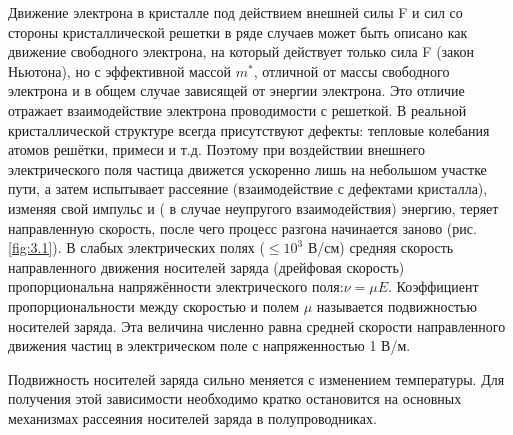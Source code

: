 Движение электрона в кристалле под действием внешней силы F и сил со стороны кристаллической решетки в ряде случаев
может быть описано как движение свободного электрона, на который действует только сила F (закон Ньютона), но с
эффективной массой $m^*$, отличной от массы свободного электрона и в общем случае зависящей от энергии электрона. Это
отличие отражает взаимодействие электрона проводимости с решеткой. 
В реальной кристаллической структуре всегда присутствуют дефекты: тепловые колебания атомов решётки, примеси и т.д.
Поэтому при воздействии внешнего электрического поля частица движется ускоренно лишь на небольшом участке пути, а затем
испытывает рассеяние (взаимодействие с дефектами кристалла), изменяя свой импульс и ( в случае неупругого
взаимодействия) энергию, теряет направленную скорость, после чего процесс разгона начинается заново (рис. \ref{fig:3.1}). В слабых
электрических полях ($\leq 10^3$ В/см) средняя скорость направленного движения носителей заряда (дрейфовая скорость)
пропорциональна напряжённости электрического поля:$\nu = \mu E$. Коэффициент пропорциональности между скоростью и полем $\mu$
называется подвижностью носителей заряда. Эта величина численно равна средней скорости направленного движения частиц в
электрическом поле с напряженностью 1 В/м. 

Подвижность носителей заряда сильно меняется с изменением температуры. Для получения этой зависимости необходимо кратко
остановится на основных механизмах рассеяния носителей заряда в полупроводниках. 

